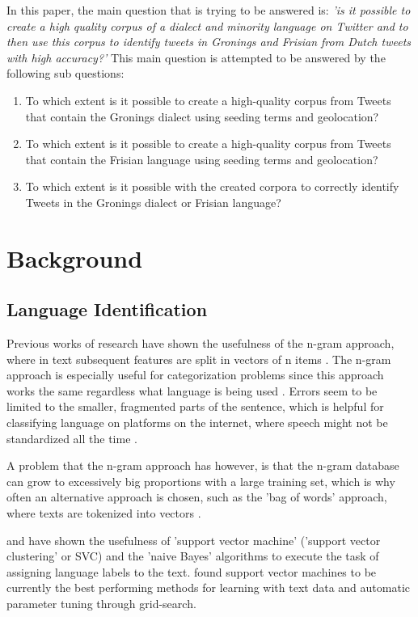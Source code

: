 \documentclass[
10pt, %
a4paper, %
oneside, %
headinclude,footinclude, %
] {book}%
\begin{document}
In this paper, the main question that is trying to be answered is: \emph{'is it possible to create a high quality corpus of a dialect and minority language on Twitter and to then use this corpus to identify tweets in Gronings and Frisian from Dutch tweets with high accuracy?'} This main question is attempted to be answered by the following sub questions: 
\begin{enumerate}

\item To which extent is it possible to create a high-quality corpus from Tweets that contain the Gronings dialect using seeding terms and geolocation?
\item To which extent is it possible to create a high-quality corpus from Tweets that contain the Frisian language using seeding terms and geolocation?
\item To which extent is it possible with the created corpora to correctly identify Tweets in the Gronings dialect or Frisian language?

\end{enumerate}

\chapter{Background}

\section{Language Identification}

Previous works of research have shown the usefulness of the n-gram approach, where in text subsequent features are split in vectors of n items \citep{scott}. The n-gram approach is especially useful for categorization problems since this approach works the same regardless what language is being used \citep{silva}. Errors seem to be limited to the smaller, fragmented parts of the sentence, which is helpful for classifying language on platforms on the internet, where speech might not be standardized all the time \citep{silva}.

A problem that the n-gram approach has however, is that the n-gram database can grow to excessively big proportions with a large training set, which is why often an alternative approach is chosen, such as the 'bag of words' approach, where texts are tokenized into vectors \citep{scott}.

\citep{joachims} and \citep{silva} have shown the usefulness of 'support vector machine' ('support vector clustering' or SVC) and the 'naive Bayes' algorithms to execute the task of assigning language labels to the text. \citep{joachims} found support vector machines to be currently the best performing methods for learning with text data and automatic parameter tuning through grid-search. 
\end{document}
